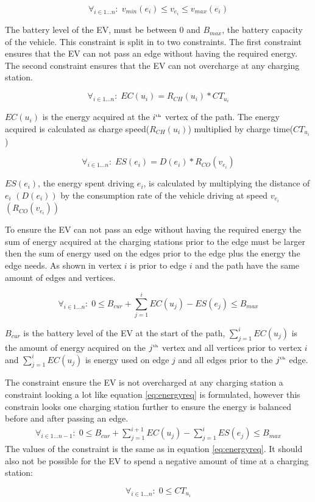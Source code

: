 \begin{equation*}
\forall_{i\in1 \dots n }:\;v_{min}(e_i) \leq v_{e_i} \leq v_{max}(e_i)
\end{equation*}

The battery level of the EV, must be between $0$ and $B_{max}$, the battery capacity of the vehicle.
This constraint is split in to two constraints. The first constraint ensures that the EV can not pass an edge without having the required energy. The second constraint ensures that the EV can not overcharge at any charging station.

\begin{equation*}
\forall_{i\in1 \dots n }:\; EC(u_i) = R_{CH}(u_i) * CT_{u_i}
\end{equation*}

$EC(u_i)$ is the energy acquired at the $i^{\text{\tiny th}}$ vertex of the path. The energy acquired is calculated as charge speed($R_{CH}(u_i)$) multiplied by charge time($CT_{u_i}$)

\begin{equation*}
\forall_{i\in1 \dots n }:\; ES(e_i) = D(e_i)*R_{CO}(v_{e_i})
\end{equation*}

$ES(e_i)$, the energy spent driving $e_i$, is calculated by multiplying the distance of $e_i$ $(D(e_i))$ by the consumption rate of the vehicle driving at speed $v_{e_i}$ $(R_{CO}(v_{e_i}))$

To ensure the EV can not pass an edge without having the required energy the sum of energy acquired at the charging stations prior to the edge must be larger then the sum of energy used on the edges prior to the edge plus the energy the edge needs. As shown in  vertex $i$ is prior to edge $i$ and the path have the same amount of edges and vertices.

\begin{equation*}
\forall_{i\in1 \dots n }:\;0 \leq B_{cur} + \sum_{j=1}^{i} EC(u_j) - ES(e_j) \leq B_{max}
\end{equation*}\label{eq:energyreq}

$B_{cur}$ is the battery level of the EV at the start of the path, $ \sum_{j=1}^{i} EC(u_j)$ is the amount of energy acquired on the $j^{\text{\tiny th}}$ vertex and all vertices prior to vertex $i$ and $\sum_{j=1}^{i} EC(u_j)$ is energy used on edge $j$ and all edges prior to the $j^{\text{\tiny th}}$ edge.

The constraint ensure the EV is not overcharged at any charging station a constraint looking a lot like equation \ref{eq:energyreq} is formulated, however this constrain looks one charging station further to ensure the energy is balanced before and after passing an edge.
\begin{equation*}
\begin{aligned}
\forall_{i\in1 \dots n-1}:\;0 \leq B_{cur} + \sum_{j=1}^{i+1} EC(u_j) - \sum_{j=1}^{i} ES(e_j) \leq B_{max}
\end{aligned}
\end{equation*}
The values of the constraint is the same as in equation \ref{eq:energyreq}. It should also not be possible for the EV to spend a negative amount of time at a charging station:

\begin{equation*}
\forall_{i\in1 \dots n }:\; 0 \leq CT_{u_i}
\end{equation*}
